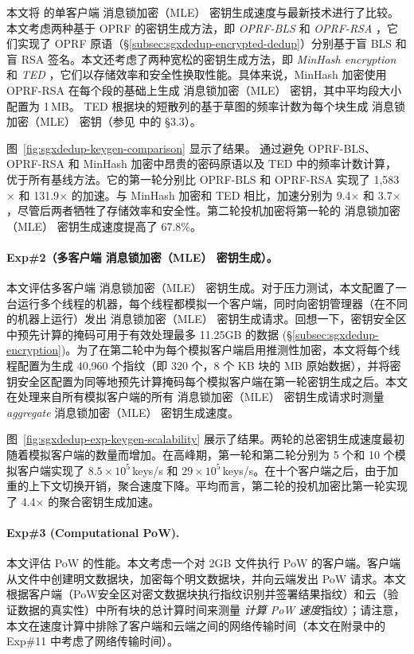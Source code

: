 本文将 \sysnameS 的单客户端 消息锁加密（MLE） 密钥生成速度与最新技术进行了比较。本文考虑两种基于 OPRF 的密钥生成方法，即 \textit{ OPRF-BLS} \cite{armknecht2015transparent} 和 \textit{ OPRF-RSA} \cite{bellare2013DupLESS}，它们实现了 OPRF 原语（\S\ref{subsec:sgxdedup-encrypted-dedup}）分别基于盲 BLS 和盲 RSA 签名。本文还考虑了两种宽松的密钥生成方法，即 \textit{ MinHash encryption} \cite{qin17} 和 \textit{ TED} \cite{li20b}，它们以存储效率和安全性换取性能。具体来说，MinHash 加密使用 OPRF-RSA 在每个段的基础上生成 消息锁加密（MLE） 密钥，其中平均段大小配置为 1\,MB。 TED 根据块的短散列的基于草图的频率计数为每个块生成 消息锁加密（MLE） 密钥（参见 \cite{li20b} 中的 \S3.3）。

图~\ref{fig:sgxdedup-keygen-comparison} 显示了结果。 \sysnameS 通过避免 OPRF-BLS、OPRF-RSA 和 MinHash 加密中昂贵的密码原语以及 TED 中的频率计数计算，优于所有基线方法。它的第一轮分别比 OPRF-BLS 和 OPRF-RSA 实现了 1,583$\times$ 和 131.9$\times$ 的加速。与 MinHash 加密和 TED 相比，加速分别为 9.4$\times$ 和 3.7$\times$，尽管后两者牺牲了存储效率和安全性。第二轮投机加密将第一轮的 消息锁加密（MLE） 密钥生成速度提高了 67.8\%。



\paragraph*{Exp\#2（多客户端 消息锁加密（MLE） 密钥生成）。} 本文评估多客户端 消息锁加密（MLE） 密钥生成。对于压力测试，本文配置了一台运行多个线程的机器，每个线程都模拟一个客户端，同时向密钥管理器（在不同的机器上运行）发出 消息锁加密（MLE） 密钥生成请求。回想一下，密钥安全区中预先计算的掩码可用于有效处理最多 11.25GB 的数据 (\S\ref{subsec:sgxdedup-encryption})。为了在第二轮中为每个模拟客户端启用推测性加密，本文将每个线程配置为生成 40,960 个指纹（即 320 个，8 个 KB 块的 MB 原始数据），并将密钥安全区配置为同等地预先计算掩码每个模拟客户端在第一轮密钥生成之后。本文在处理来自所有模拟客户端的所有 消息锁加密（MLE） 密钥生成请求时测量 \textit{ aggregate} 消息锁加密（MLE） 密钥生成速度。

图~\ref{fig:sgxdedup-exp-keygen-scalability} 展示了结果。两轮的总密钥生成速度最初随着模拟客户端的数量而增加。在高峰期，第一轮和第二轮分别为 5 个和 10 个模拟客户端实现了 $8.5\times 10^5$\,keys/s 和 $29\times 10^5$\,keys/s。在十个客户端之后，由于加重的上下文切换开销，聚合速度下降。平均而言，第二轮的投机加密比第一轮实现了 4.4$\times$ 的聚合密钥生成加速。


\paragraph*{Exp\#3 (Computational PoW).} 本文评估 PoW 的性能。本文考虑一个对 2GB 文件执行 PoW 的客户端。客户端从文件中创建明文数据块，加密每个明文数据块，并向云端发出 PoW 请求。本文根据客户端（PoW安全区对密文数据块执行指纹识别并签署结果指纹）和云（验证数据的真实性）中所有块的总计算时间来测量 \textit{ 计算 PoW 速度}指纹）；请注意，本文在速度计算中排除了客户端和云端之间的网络传输时间（本文在附录中的 Exp\#11 中考虑了网络传输时间）。

